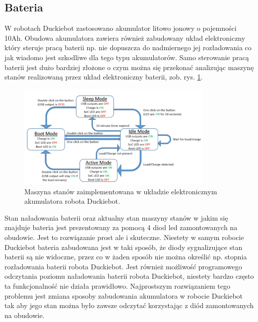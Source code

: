 \documentclass{svproc}
\begin{document}


\subsection{Bateria}
W robotach Duckiebot zastosowano akumulator litowo jonowy o pojemności 10Ah. Obudowa akumulatora zawiera również zabudowany układ elektroniczny który steruje pracą baterii np. nie dopuszcza do nadmiernego jej rozładowania co jak wiadomo jest szkodliwe dla tego typu akumulatorów. Samo sterowanie pracą baterii jest dużo bardziej złożone o czym można się przekonać analizując maszynę stanów realizowaną przez układ elektroniczny baterii, zob. rys. \ref{fig:battery-state-machine}.

\begin{figure}[ht!]
    \centering
    \includegraphics[width=0.85\textwidth]{BatteryStateMachine.png}
    \caption{Maszyna stanów zaimplementowana w układzie elektronicznym akumulatora robota Duckiebot.}
    \label{fig:battery-state-machine}
\end{figure}

Stan naładowania baterii oraz aktualny stan maszyny stanów w jakim się znajduje bateria jest prezentowany za pomocą 4 diod led zamontowanych na obudowie. Jest to rozwiązanie prost ale i skuteczne. Niestety w samym robocie Duckiebot bateria zabudowana jest w taki sposób, że diody sygnalizujące stan baterii są nie widoczne, przez co w żaden sposób nie można określić np. stopnia rozładowania baterii robota Duckiebot. Jest również możliwość programowego odczytania poziomu naładowania baterii robota Duckiebot, niestety bardzo często ta funkcjonalność nie działa prawidłowo. Najprostszym rozwiązaniem tego problemu jest zmiana sposoby zabudowania akumulatora w robocie Duckiebot tak aby jego stan można było zawsze odczytać korzystając z diód zamontowanych na obudowie. 
\end{document}
